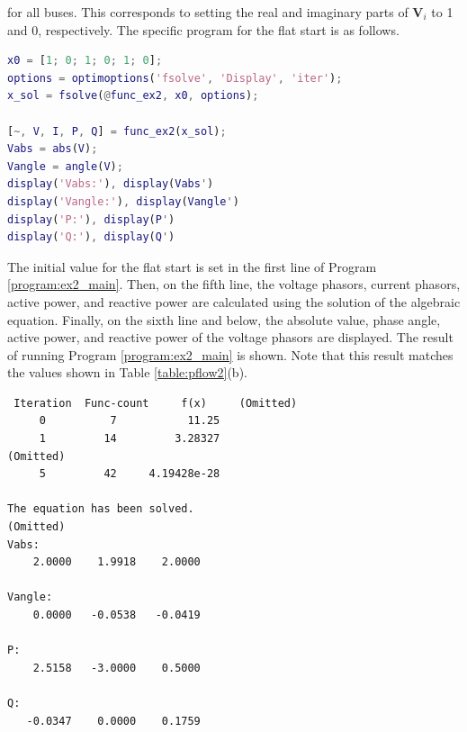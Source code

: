 \documentclass[graybox, envcountchap]{svmult}
\begin{document}
\begin{example}
for all buses. This corresponds to setting the real and imaginary parts of $\bm
V_i$ to 1 and 0, respectively. The specific program for the flat start is as
follows.

\begin{lstlisting}[language=Matlab, caption=main\_ex2.m, label={program:ex2_main}]
x0 = [1; 0; 1; 0; 1; 0];
options = optimoptions('fsolve', 'Display', 'iter');
x_sol = fsolve(@func_ex2, x0, options);

[~, V, I, P, Q] = func_ex2(x_sol);
Vabs = abs(V);
Vangle = angle(V);
display('Vabs:'), display(Vabs')
display('Vangle:'), display(Vangle')
display('P:'), display(P')
display('Q:'), display(Q')
\end{lstlisting}

The initial value for the flat start is set in the first line of Program
\ref{program:ex2_main}. Then, on the fifth line, the voltage phasors, current
phasors, active power, and reactive power are calculated using the solution of
the algebraic equation. Finally, on the sixth line and below, the absolute
value, phase angle, active power, and reactive power of the voltage phasors are
displayed. The result of running Program \ref{program:ex2_main} is shown. Note
that this result matches the values shown in Table \ref{table:pflow2}(b).

\smallskip
\begin{execution}
\begin{verbatim}
 Iteration  Func-count     f(x)     (Omitted)
     0          7           11.25 
     1         14         3.28327 
(Omitted)
     5         42     4.19428e-28

The equation has been solved.
(Omitted)
Vabs:
    2.0000    1.9918    2.0000

Vangle:
    0.0000   -0.0538   -0.0419

P:
    2.5158   -3.0000    0.5000

Q:
   -0.0347    0.0000    0.1759
\end{verbatim}
\end{execution}

\end{example}

\end{document}
